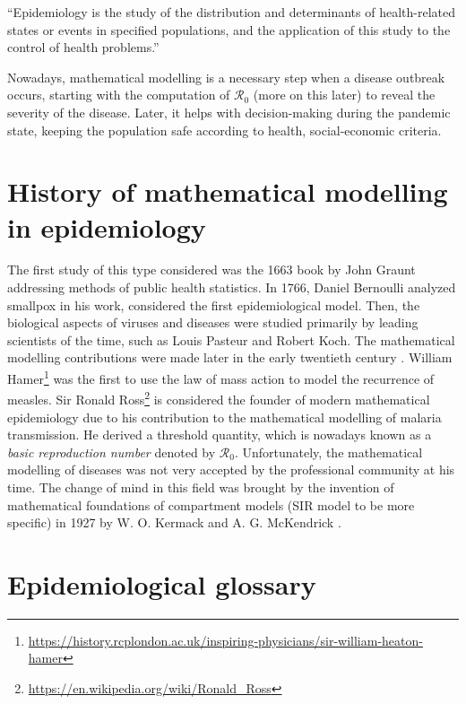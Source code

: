 \documentclass[
  digital, %
  oneside, %
  lof,     %
  lot,     %
]{fithesis4}
\begin{document}
\begin{displayquote}
  ``Epidemiology is the study of the distribution and
  determinants of health-related states or events in specified
  populations, and the application of this study to the control
  of health problems.''
\end{displayquote}

Nowadays, mathematical modelling is a necessary step when a disease outbreak occurs, starting with the computation of $\mathcal{R}_0$ (more on this later) to reveal the severity of the disease.
Later, it helps with decision-making during the pandemic state, keeping the population safe according to health, social-economic criteria.


\section{History of mathematical modelling in epidemiology}

The first study of this type considered was the 1663 book by John Graunt addressing methods of public health statistics.
In 1766, Daniel Bernoulli analyzed smallpox in his work, considered the first epidemiological model.
Then, the biological aspects of viruses and diseases were studied primarily by leading scientists of the time, such as Louis Pasteur and Robert Koch.
The mathematical modelling contributions were made later in the early twentieth century \cite[Chapter~1.4]{martcheva2015}.
William Hamer\footnote{\url{https://history.rcplondon.ac.uk/inspiring-physicians/sir-william-heaton-hamer}} was the first to use the law of mass action to model the recurrence of measles. 
Sir Ronald Ross\footnote{\url{https://en.wikipedia.org/wiki/Ronald_Ross}} is considered the founder of modern mathematical epidemiology due to his contribution to the mathematical modelling of malaria transmission.
He derived a threshold quantity, which is nowadays known as a \textit{basic reproduction number} denoted by $\mathcal{R}_0$.
Unfortunately, the mathematical modelling of diseases was not very accepted by the professional community at his time.
The change of mind in this field was brought by the invention of mathematical foundations of compartment models (SIR model to be more specific) in 1927 by W. O. Kermack and A. G. McKendrick \cite{kermack1927}.



\section{Epidemiological glossary}
\end{document}

